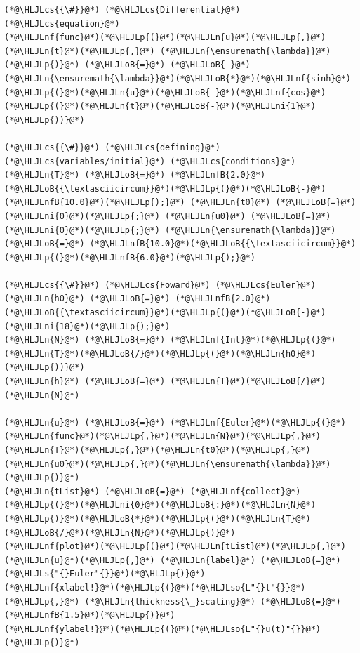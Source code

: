 \documentclass[12pt,a4paper]{article}
\newcommand{\HLJLn}[1]{#1}
\newcommand{\HLJLnf}[1]{\textcolor[RGB]{66,102,213}{#1}}
\newcommand{\HLJLs}[1]{\textcolor[RGB]{201,61,57}{#1}}
\newcommand{\HLJLso}[1]{\textcolor[RGB]{201,61,57}{#1}}
\newcommand{\HLJLnfB}[1]{\textcolor[RGB]{59,151,46}{#1}}
\newcommand{\HLJLni}[1]{\textcolor[RGB]{59,151,46}{#1}}
\newcommand{\HLJLoB}[1]{\textcolor[RGB]{102,102,102}{\textbf{#1}}}
\newcommand{\HLJLp}[1]{#1}
\newcommand{\HLJLcs}[1]{\textcolor[RGB]{153,153,119}{\textit{#1}}}
\begin{document}
\begin{lstlisting}
(*@\HLJLcs{{\#}}@*) (*@\HLJLcs{Differential}@*) (*@\HLJLcs{equation}@*)
(*@\HLJLnf{func}@*)(*@\HLJLp{(}@*)(*@\HLJLn{u}@*)(*@\HLJLp{,}@*) (*@\HLJLn{t}@*)(*@\HLJLp{,}@*) (*@\HLJLn{\ensuremath{\lambda}}@*)(*@\HLJLp{)}@*) (*@\HLJLoB{=}@*) (*@\HLJLoB{-}@*)(*@\HLJLn{\ensuremath{\lambda}}@*)(*@\HLJLoB{*}@*)(*@\HLJLnf{sinh}@*)(*@\HLJLp{(}@*)(*@\HLJLn{u}@*)(*@\HLJLoB{-}@*)(*@\HLJLnf{cos}@*)(*@\HLJLp{(}@*)(*@\HLJLn{t}@*)(*@\HLJLoB{-}@*)(*@\HLJLni{1}@*)(*@\HLJLp{))}@*)

(*@\HLJLcs{{\#}}@*) (*@\HLJLcs{defining}@*) (*@\HLJLcs{variables/initial}@*) (*@\HLJLcs{conditions}@*)
(*@\HLJLn{T}@*) (*@\HLJLoB{=}@*) (*@\HLJLnfB{2.0}@*)(*@\HLJLoB{{\textasciicircum}}@*)(*@\HLJLp{(}@*)(*@\HLJLoB{-}@*)(*@\HLJLnfB{10.0}@*)(*@\HLJLp{);}@*) (*@\HLJLn{t0}@*) (*@\HLJLoB{=}@*) (*@\HLJLni{0}@*)(*@\HLJLp{;}@*) (*@\HLJLn{u0}@*) (*@\HLJLoB{=}@*) (*@\HLJLni{0}@*)(*@\HLJLp{;}@*) (*@\HLJLn{\ensuremath{\lambda}}@*) (*@\HLJLoB{=}@*) (*@\HLJLnfB{10.0}@*)(*@\HLJLoB{{\textasciicircum}}@*)(*@\HLJLp{(}@*)(*@\HLJLnfB{6.0}@*)(*@\HLJLp{);}@*)

(*@\HLJLcs{{\#}}@*) (*@\HLJLcs{Foward}@*) (*@\HLJLcs{Euler}@*)
(*@\HLJLn{h0}@*) (*@\HLJLoB{=}@*) (*@\HLJLnfB{2.0}@*)(*@\HLJLoB{{\textasciicircum}}@*)(*@\HLJLp{(}@*)(*@\HLJLoB{-}@*)(*@\HLJLni{18}@*)(*@\HLJLp{);}@*)
(*@\HLJLn{N}@*) (*@\HLJLoB{=}@*) (*@\HLJLnf{Int}@*)(*@\HLJLp{(}@*)(*@\HLJLn{T}@*)(*@\HLJLoB{/}@*)(*@\HLJLp{(}@*)(*@\HLJLn{h0}@*)(*@\HLJLp{))}@*)
(*@\HLJLn{h}@*) (*@\HLJLoB{=}@*) (*@\HLJLn{T}@*)(*@\HLJLoB{/}@*)(*@\HLJLn{N}@*)

(*@\HLJLn{u}@*) (*@\HLJLoB{=}@*) (*@\HLJLnf{Euler}@*)(*@\HLJLp{(}@*)(*@\HLJLn{func}@*)(*@\HLJLp{,}@*)(*@\HLJLn{N}@*)(*@\HLJLp{,}@*)(*@\HLJLn{T}@*)(*@\HLJLp{,}@*)(*@\HLJLn{t0}@*)(*@\HLJLp{,}@*)(*@\HLJLn{u0}@*)(*@\HLJLp{,}@*)(*@\HLJLn{\ensuremath{\lambda}}@*)(*@\HLJLp{)}@*)
(*@\HLJLn{tList}@*) (*@\HLJLoB{=}@*) (*@\HLJLnf{collect}@*)(*@\HLJLp{(}@*)(*@\HLJLni{0}@*)(*@\HLJLoB{:}@*)(*@\HLJLn{N}@*)(*@\HLJLp{)}@*)(*@\HLJLoB{*}@*)(*@\HLJLp{(}@*)(*@\HLJLn{T}@*)(*@\HLJLoB{/}@*)(*@\HLJLn{N}@*)(*@\HLJLp{)}@*)
(*@\HLJLnf{plot}@*)(*@\HLJLp{(}@*)(*@\HLJLn{tList}@*)(*@\HLJLp{,}@*) (*@\HLJLn{u}@*)(*@\HLJLp{,}@*) (*@\HLJLn{label}@*) (*@\HLJLoB{=}@*) (*@\HLJLs{"{}Euler"{}}@*)(*@\HLJLp{)}@*)
(*@\HLJLnf{xlabel!}@*)(*@\HLJLp{(}@*)(*@\HLJLso{L"{}t"{}}@*)(*@\HLJLp{,}@*) (*@\HLJLn{thickness{\_}scaling}@*) (*@\HLJLoB{=}@*) (*@\HLJLnfB{1.5}@*)(*@\HLJLp{)}@*)
(*@\HLJLnf{ylabel!}@*)(*@\HLJLp{(}@*)(*@\HLJLso{L"{}u(t)"{}}@*)(*@\HLJLp{)}@*)
\end{lstlisting}
\end{document}
